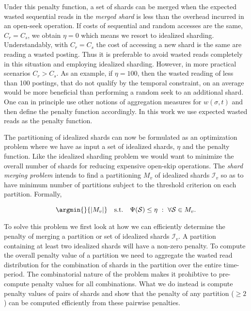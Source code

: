 Under this penalty function, a set of shards can be merged when the expected wasted sequential reads in the \emph{merged shard} is less than the
overhead incurred in an open-seek operation. If costs of sequential and random accesses are the same, $C_r = C_s$, we obtain $\eta = 0$ which means we resort to idealized sharding. Understandably, with $C_r = C_s$  the cost of accessing a new shard is the same are reading a wasted posting. Thus it is preferable to avoid wasted reads completely in this situation and employing idealized sharding. However, in more practical scenarios $C_r > C_s$.  As an example, if $\eta
= 100$, then the wasted reading of less than 100 postings, that do not
qualify by the temporal constraint, on an average would be more
beneficial than performing a random seek to an additional shard. One can in principle use other notions of aggregation measures for $w(\sigma, t)$ and then define the penalty function accordingly. In this work we use expected wasted reads as the penalty function. 


The partitioning of idealized shards can now be formulated as an optimization problem where we have as input a set of idealized shards, $\eta$ and the penalty function. Like the idealized sharding problem we would want to minimize the overall number of shards for reducing expensive open-skip operations. The \emph{shard merging problem} intends to find a partitioning $M_v$ of idealized shards $\mathcal{I}_v$ so as to have minimum number of partitions subject to the threshold criterion on each partition. Formally, 

\begin{definition}

$$
\argmin{}{|M_v|} \quad \mbox{s.t.} \quad \Psi(\mathcal{S})  \leq \eta \,\,: \,\, \forall \mathcal{S} \in M_v.
$$

\label{def:mwr}
\end{definition}


To solve this problem we first look at how we can efficiently determine the penalty of merging a partition or set of idealized shards $\mathcal{I}_v$. 
A partition containing at least two idealized shards will have a non-zero penalty. To compute the overall penalty value of a partition we need to aggregate the wasted read distribution for the combination of shards in the partition over the entire time-period. The combinatorial nature of the problem makes it prohibtive to pre-compute penalty values for all combinations. What we do instead is compute penalty values of pairs of shards and show that the penalty of any partition ($\ge 2$) can be computed efficiently from these pairwise penalties.

